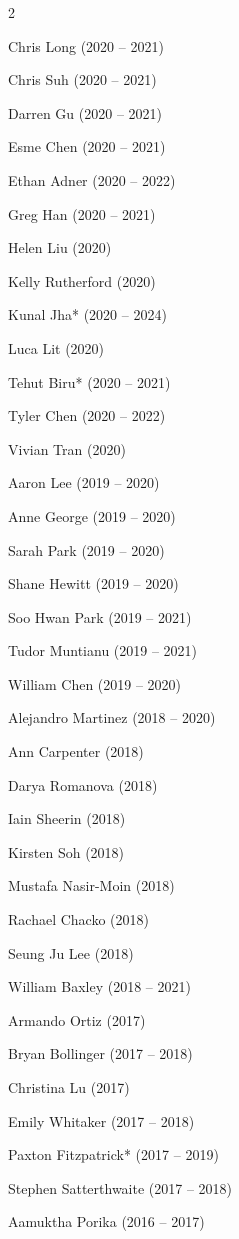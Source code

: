 \documentclass[11pt, a4paper]{article} %
\begin{document}
\begin{multicols}{2}
\begin{etaremune}
  \item Chris Long (2020 -- 2021)
  \item Chris Suh (2020 -- 2021)
  \item Darren Gu (2020 -- 2021)
  \item Esme Chen (2020 -- 2021)
  \item Ethan Adner (2020 -- 2022)
  \item Greg Han (2020 -- 2021)
  \item Helen Liu (2020)
  \item Kelly Rutherford (2020)
  \item Kunal Jha* (2020 -- 2024)
  \item Luca Lit (2020)
  \item Tehut Biru* (2020 -- 2021)
  \item Tyler Chen (2020 -- 2022)
  \item Vivian Tran (2020)
  \item Aaron Lee (2019 -- 2020)
  \item Anne George (2019 -- 2020)
  \item Sarah Park (2019 -- 2020)
  \item Shane Hewitt (2019 -- 2020)
  \item Soo Hwan Park (2019 -- 2021)
  \item Tudor Muntianu (2019 -- 2021)
  \item William Chen (2019 -- 2020)
  \item Alejandro Martinez (2018 -- 2020)
  \item Ann Carpenter (2018)
  \item Darya Romanova (2018)
  \item Iain Sheerin (2018)
  \item Kirsten Soh (2018)
  \item Mustafa Nasir-Moin (2018)
  \item Rachael Chacko (2018)
  \item Seung Ju Lee (2018)
  \item William Baxley (2018 -- 2021)
  \item Armando Ortiz (2017)
  \item Bryan Bollinger (2017 -- 2018)
  \item Christina Lu (2017)
  \item Emily Whitaker (2017 -- 2018)
  \item Paxton Fitzpatrick* (2017 -- 2019)
  \item Stephen Satterthwaite (2017 -- 2018)
  \item Aamuktha Porika (2016 -- 2017)

\end{etaremune}
\end{multicols}
\end{document}
